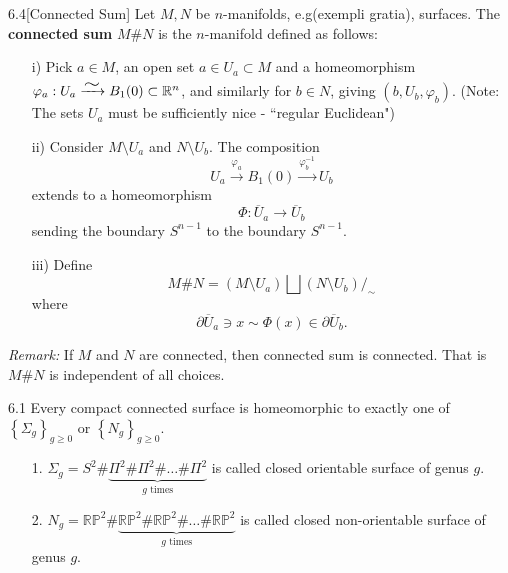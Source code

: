\begin{customdefinition}{6.4}[Connected Sum] Let $M, N$ be $n$-manifolds, e.g(exempli gratia), surfaces. The {\bf connected sum} $M\#N$ is the $n$-manifold defined as follows:
\begin{enumerate}
    \item[i)] Pick $a \in M$, an open set $a \in U_a \subset M$ and a homeomorphism $\varphi_a : U_a \xrightarrow{\widesim{}} B_1(0) \subset \R^n$, and similarly for $b \in N$, giving $\left(b, U_b, \varphi_b\right)$. (Note: The sets $U_a$ must be sufficiently nice - ``regular Euclidean")
    \item[ii)] Consider $M \setminus U_a$ and $N \setminus U_b$. The composition 
            $$U_a \xrightarrow{\varphi_a} B_1(0) \xrightarrow{\varphi^{-1}_b} U_b$$
            extends to a homeomorphism 
            $$\Phi: \overline{U}_a \longrightarrow \overline{U}_b$$ 
            sending the boundary $S^{n-1}$ to the boundary $S^{n-1}$.
    \item[iii)] Define 
            $$M \# N = \left(M \setminus U_a\right) \bigsqcup \left(N \setminus U_b\right) /_{\sim}$$
            where 
            $$\partial \overline{U}_a \ni x \sim \Phi(x) \in \partial \overline{U}_b.$$
\end{enumerate}
\emph{Remark: }If $M$ and $N$ are connected, then connected sum is connected. That is $M\# N$ is independent of all choices.
\end{customdefinition}

\begin{customthm}{6.1}
Every compact connected surface is homeomorphic to exactly one of $\left\{\Sigma_g\right\}_{g \geqslant 0}$ or $\left\{N_g\right\}_{g \geqslant 0}$.
\begin{enumerate}
    \item[1.] $\Sigma_g = S^2 \# \underbrace{\Pi^2 \# \Pi^2 \# \dots \# \Pi^2}_{g \text{ times}}$ is called closed orientable surface of genus $g$.
    \item[2.] $N_g = \mathbb{RP}^2\# \underbrace{\mathbb{RP}^2 \# \mathbb{RP}^2 \# \dots \# \mathbb{RP}^2}_{g \text{ times}}$ is called closed non-orientable surface of genus $g$.
\end{enumerate}
\end{customthm}

